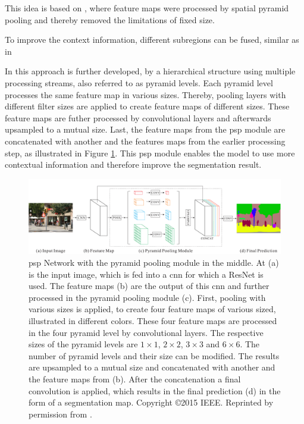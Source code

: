 This idea is based on \cite{He15-SPP}, where feature maps were processed by spatial pyramid pooling and thereby removed the limitations of fixed size.

To improve the context information, different subregions can be fused, similar as in 

In \cite{Zhao17-PSP} this approach is further developed, by a hierarchical structure using multiple processing streams, also referred to as pyramid levels.
Each pyramid level processes the same feature map in various sizes.
Thereby, pooling layers with different filter sizes are applied to create feature maps of different sizes.
These feature maps are futher processed by convolutional layers and afterwards upsampled to a mutual size.
Last, the feature maps from the \gls{psp} module are concatenated with another and the features maps from the earlier processing step, as illustrated in Figure \ref{fig:ch2:sec2:psp}.
This \gls{psp} module enables the model to use more contextual information and therefore improve the segmentation result.
\begin{figure}
	\includegraphics[width=\linewidth]{figures/chap223_psp.png}
	\caption[Pyramid Scene Parsing Network]{
		\gls{psp} Network with the pyramid pooling module in the middle.
		At (a) is the input image, which is fed into a \gls{cnn} for which a ResNet is used. 
		The feature maps (b) are the output of this \gls{cnn} and further processed in the pyramid pooling module (c).
		First, pooling with various sizes is applied, to create four feature maps of various sized, illustrated in different colors.
		These four feature maps are processed in the four pyramid level by convolutional layers.
		The respective sizes of the pyramid levels are $1 \times 1$, $2 \times 2$, $3 \times 3$ and  $6 \times 6$.
		The number of pyramid levels and their size can be modified.
		The results are upsampled to a mutual size and concatenated with another and the feature maps from (b).
		After the concatenation a final convolution is applied, which results in the final prediction (d) in the form of a segmentation map.
		Copyright \copyright 2015 IEEE. Reprinted by permission from \cite{Zhao17-PSP}.}
	\label{fig:ch2:sec2:psp}
\end{figure}



